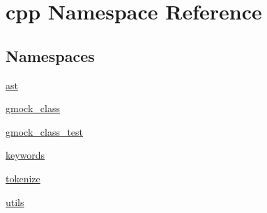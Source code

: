 \hypertarget{namespacecpp}{}\section{cpp Namespace Reference}
\label{namespacecpp}
\subsection*{Namespaces}
\begin{DoxyCompactItemize}
\item 
 \mbox{\hyperlink{namespacecpp_1_1ast}{ast}}
\item 
 \mbox{\hyperlink{namespacecpp_1_1gmock__class}{gmock\+\_\+class}}
\item 
 \mbox{\hyperlink{namespacecpp_1_1gmock__class__test}{gmock\+\_\+class\+\_\+test}}
\item 
 \mbox{\hyperlink{namespacecpp_1_1keywords}{keywords}}
\item 
 \mbox{\hyperlink{namespacecpp_1_1tokenize}{tokenize}}
\item 
 \mbox{\hyperlink{namespacecpp_1_1utils}{utils}}
\end{DoxyCompactItemize}
